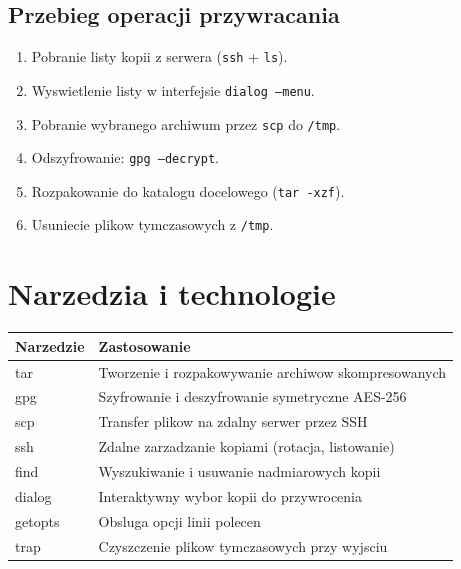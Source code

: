 \documentclass[a4paper,12pt]{article}
\begin{document}
\subsection{Przebieg operacji przywracania}

\begin{enumerate}[leftmargin=1.5em, itemsep=1pt, topsep=2pt]
  \item Pobranie listy kopii z serwera (\texttt{ssh} + \texttt{ls}).
  \item Wyswietlenie listy w interfejsie \texttt{dialog --menu}.
  \item Pobranie wybranego archiwum przez \texttt{scp} do \texttt{/tmp}.
  \item Odszyfrowanie: \texttt{gpg --decrypt}.
  \item Rozpakowanie do katalogu docelowego (\texttt{tar -xzf}).
  \item Usuniecie plikow tymczasowych z \texttt{/tmp}.
\end{enumerate}

\section{Narzedzia i technologie}

\begin{center}
\begin{tabular}{>{\ttfamily}lp{9cm}}
  \toprule
  \normalfont\textbf{Narzedzie} & \textbf{Zastosowanie} \\
  \midrule
  tar       & Tworzenie i rozpakowywanie archiwow skompresowanych \\
  gpg       & Szyfrowanie i deszyfrowanie symetryczne AES-256 \\
  scp       & Transfer plikow na zdalny serwer przez SSH \\
  ssh       & Zdalne zarzadzanie kopiami (rotacja, listowanie) \\
  find      & Wyszukiwanie i usuwanie nadmiarowych kopii \\
  dialog    & Interaktywny wybor kopii do przywrocenia \\
  getopts   & Obsluga opcji linii polecen \\
  trap      & Czyszczenie plikow tymczasowych przy wyjsciu \\
  \bottomrule
\end{tabular}
\end{center}

\end{document}
